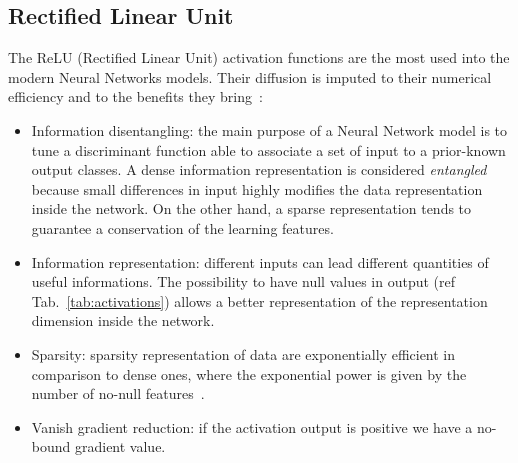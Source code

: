 \documentclass{standalone}
\begin{document}
\subsection[Relu]{Rectified Linear Unit}\label{relu}

The ReLU (Rectified Linear Unit) activation functions are the most used into the modern Neural Networks models.
Their diffusion is imputed to their numerical efficiency and to the benefits they bring~\cite{Glorot2011Relu}:

\begin{itemize}

\item Information disentangling: the main purpose of a Neural Network model is to tune a discriminant function able to associate a set of input to a prior-known output classes.
A dense information representation is considered \emph{entangled} because small differences in input highly modifies the data representation inside the network.
On the other hand, a sparse representation tends to guarantee a conservation of the learning features.

\item Information representation: different inputs can lead different quantities of useful informations.
The possibility to have null values in output (ref Tab.~\ref{tab:activations}) allows a better representation of the representation dimension inside the network.

\item Sparsity: sparsity representation of data are exponentially efficient in comparison to dense ones, where the exponential power is given by the number of no-null features~\cite{Glorot2011Relu}.

\item Vanish gradient reduction: if the activation output is positive we have a no-bound gradient value.

\end{itemize}
\end{document}
